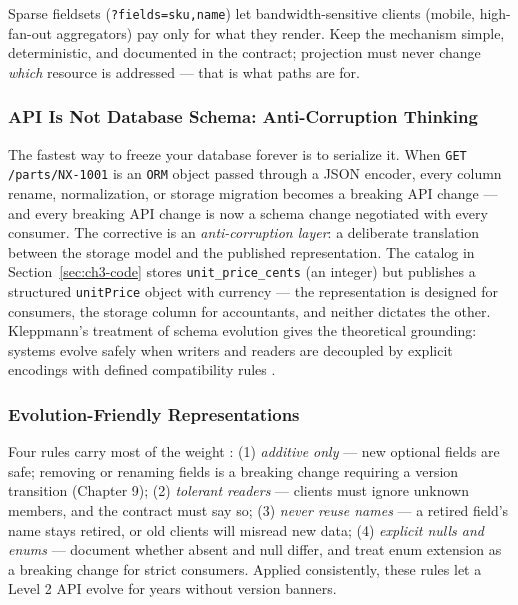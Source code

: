 Sparse fieldsets (\texttt{?fields=sku,name}) let bandwidth-sensitive clients
(mobile, high-fan-out aggregators) pay only for what they render. Keep the
mechanism simple, deterministic, and documented in the contract; projection must
never change \emph{which} resource is addressed --- that is what paths are for.

\subsubsection{API Is Not Database Schema: Anti-Corruption Thinking}

The fastest way to freeze your database forever is to serialize it. When
\texttt{GET /parts/NX-1001} is an \texttt{ORM} object passed through a JSON
encoder, every column rename, normalization, or storage migration becomes a
breaking API change --- and every breaking API change is now a schema change
negotiated with every consumer. The corrective is an \emph{anti-corruption
layer}: a deliberate translation between the storage model and the published
representation. The catalog in Section~\ref{sec:ch3-code} stores
\texttt{unit\_price\_cents} (an integer) but publishes a structured
\texttt{unitPrice} object with currency --- the representation is designed for
consumers, the storage column for accountants, and neither dictates the other.
Kleppmann's treatment of schema evolution gives the theoretical grounding:
systems evolve safely when writers and readers are decoupled by explicit
encodings with defined compatibility rules \cite{kleppmann2017ddia}.

\subsubsection{Evolution-Friendly Representations}

Four rules carry most of the weight \cite{gehl2021apidesign}: (1) \emph{additive
only} --- new optional fields are safe; removing or renaming fields is a
breaking change requiring a version transition (Chapter 9); (2) \emph{tolerant
readers} --- clients must ignore unknown members, and the contract must say so;
(3) \emph{never reuse names} --- a retired field's name stays retired, or old
clients will misread new data; (4) \emph{explicit nulls and enums} --- document
whether absent and null differ, and treat enum extension as a breaking change
for strict consumers. Applied consistently, these rules let a Level 2 API evolve
for years without version banners.

